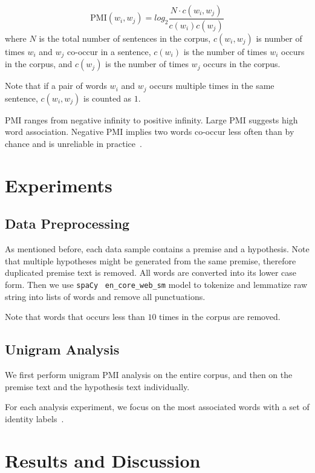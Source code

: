 \documentclass[11pt]{article}
\begin{document}
    \[
        \text{PMI}(w_i, w_j) = log_2\frac{N\cdot c(w_i, w_j)}{c(w_i)c(w_j)}
    \]
    where $N$ is the total number of sentences in the corpus,
    $c(w_i,w_j)$ is number of times $w_i$ and $w_j$ co-occur in a sentence,
    $c(w_i)$ is the number of times $w_i$ occurs in the corpus,
    and $c(w_j)$ is the number of times $w_j$ occurs in the corpus.

    Note that if a pair of words $w_i$ and $w_j$ occurs multiple times in the same sentence, $c(w_i,w_j)$ is counted
    as $1$.

    PMI ranges from negative infinity to positive infinity.
    Large PMI suggests high word association.
    Negative PMI implies two words co-occur less often than by chance and is unreliable in
    practice~\cite{speech_and_nlp_book}.


    \section{Experiments}

    \subsection{Data Preprocessing}

    As mentioned before, each data sample contains a premise and a hypothesis.
    Note that multiple hypotheses might be generated from the same premise, therefore duplicated premise text is
    removed.
    All words are converted into its lower case form.
    Then we use \texttt{spaCy}~\cite{spacy} \texttt{en\_core\_web\_sm} model to tokenize and lemmatize raw string into
    lists of words and remove all punctuations.

    Note that words that occurs less than $10$ times in the corpus are removed.

    \subsection{Unigram Analysis}

    We first perform unigram PMI analysis on the entire corpus, and then on the premise text and the hypothesis text
    individually.

    For each analysis experiment, we focus on the most associated words with a set of
    identity labels~\cite{identity_labels}.


    \section{Results and Discussion}
\end{document}
